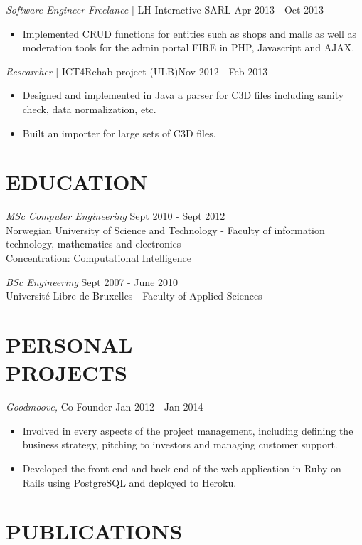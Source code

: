 \documentclass[line, margin]{res}
\begin{document}
\begin{resume}
                {\sl Software Engineer Freelance} | LH Interactive SARL \hfill            Apr 2013 - Oct 2013\\
                 \begin{itemize} %
                  \item Implemented CRUD functions for entities such as shops and malls as well as moderation tools for the admin portal FIRE in PHP, Javascript and AJAX. 
                 \end{itemize} 

                {\sl Researcher} | ICT4Rehab project (ULB)\hfill        Nov 2012 - Feb 2013 \\
                  \begin{itemize}
                   \item Designed and implemented in Java a parser for C3D files including sanity check, data normalization, etc.
                   \item Built an importer for large sets of C3D files.
                  \end{itemize} 

\section{EDUCATION} {\sl MSc Computer Engineering} \hfill   Sept 2010 - Sept 2012 \\
                    Norwegian University of Science and Technology - Faculty of information technology, mathematics and electronics \\
                    Concentration: Computational Intelligence
 
                    {\sl BSc Engineering} \hfill   Sept 2007 - June 2010 \\
                    Université Libre de Bruxelles - Faculty of Applied Sciences
 
 
\section{PERSONAL \\ PROJECTS} {\sl Goodmoove, } Co-Founder \hfill Jan 2012 - Jan 2014 \\
                  \begin{itemize}
                   \item Involved in every aspects of the project management, including defining the business strategy,
                     pitching to investors and managing customer support.
                   \item Developed the front-end and back-end of the web application in Ruby on Rails using PostgreSQL and deployed
                     to Heroku.
                  \end{itemize} 

\section{PUBLICATIONS} 
  \\[5pt]
  \\

\end{resume}
\end{document}

